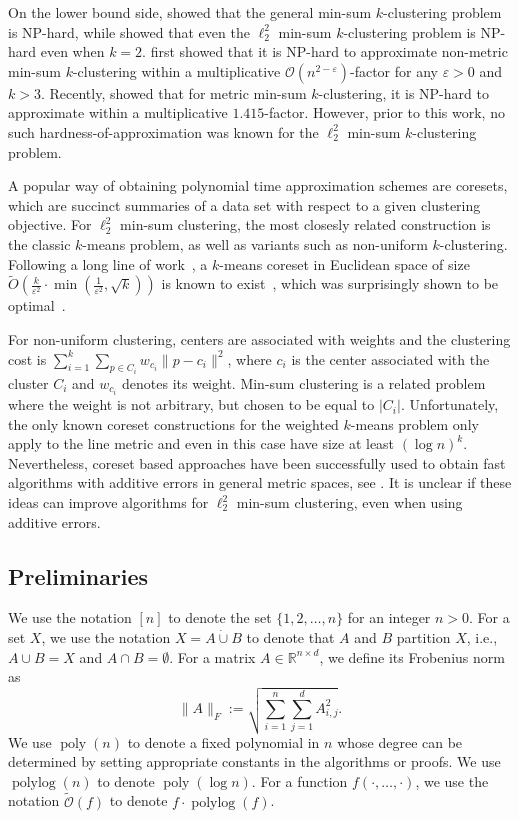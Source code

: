 \documentclass[10pt,a4paper]{amsart}
\renewcommand{\O}[1]{\ensuremath{\mathcal{O}\left(#1\right)}}
\newcommand{\tO}[1]{\ensuremath{\tilde{\mathcal{O}}\left(#1\right)}}
\newcommand{\eps}{\varepsilon}
\DeclareMathOperator*{\polylog}{polylog}
\DeclareMathOperator*{\poly}{poly}
\begin{document}
On the lower bound side,  \cite{Guttmann-BeckH98a} showed that the general min-sum $k$-clustering problem is NP-hard, while \cite{AloiseDHP09} showed that even the $\ell_2^2$ min-sum $k$-clustering problem is NP-hard even when $k=2$. 
\cite{KannKLP97} first showed that it is NP-hard to approximate non-metric min-sum $k$-clustering within a multiplicative $\O{n^{2-\eps}}$-factor for any $\eps>0$ and $k>3$. 
Recently, \cite{Cohen-AddadSL21} showed that for metric min-sum $k$-clustering, it is NP-hard to approximate within a multiplicative $1.415$-factor. 
However, prior to this work, no such hardness-of-approximation was known for the $\ell_2^2$ min-sum $k$-clustering problem. 

A popular way of obtaining polynomial time approximation schemes are coresets, which are succinct summaries of a data set with respect to a given clustering objective.
For $\ell_2^2$ min-sum clustering, the most closesly related construction is the classic $k$-means problem, as well as variants such as non-uniform $k$-clustering.
Following a long line of work~\cite{BecchettiBC0S19,FeldmanSS20,HuangV20,Cohen-AddadWZ23,WoodruffZZ23}, a $k$-means coreset in Euclidean space of size $\tilde{O}(\frac{k}{\eps^2}\cdot\min\left(\frac{1}{\eps^2},\sqrt{k}\right))$ is known to exist~\cite{Cohen-AddadSS21,Cohen-AddadLSSS22,BansalCPSS24}, which was surprisingly shown to be optimal~\cite{HuangLW24,ZhuTHH24}.

For non-uniform clustering, centers are associated with weights and the clustering cost is $\sum_{i=1}^k \sum_{p\in C_i} w_{c_i}\|p-c_i\|^2$, where $c_i$ is the center associated with the cluster $C_i$ and $w_{c_i}$ denotes its weight. Min-sum clustering is a related problem where the weight is not arbitrary, but chosen to be equal to $|C_i|$. Unfortunately, the only known coreset constructions for the weighted $k$-means problem \cite{FeldmanS12} only apply to the line metric and even in this case have size at least $(\log n)^k$.
Nevertheless, coreset based approaches have been successfully used to obtain fast algorithms with additive errors in general metric spaces, see \cite{CzumajS07}. It is unclear if these ideas can improve algorithms for $\ell_2^2$ min-sum clustering, even when using additive errors.

\subsection{Preliminaries}
We use the notation $[n]$ to denote the set $\{1,2,\ldots,n\}$ for an integer $n>0$. 
For a set $X$, we use the notation $X=A\dot\cup B$ to denote that $A$ and $B$ partition $X$, i.e., $A\cup B=X$ and $A\cap B=\emptyset$. 
For a matrix $A\in\mathbb{R}^{n\times d}$, we define its Frobenius norm as
\[\|A\|_F:=\sqrt{\sum_{i=1}^n\sum_{j=1}^d A_{i,j}^2}.\]
We use $\poly(n)$ to denote a fixed polynomial in $n$ whose degree can be determined by setting appropriate constants in the algorithms or proofs. 
We use $\polylog(n)$ to denote $\poly(\log n)$. 
For a function $f(\cdot,\ldots,\cdot)$, we use the notation $\tO{f}$ to denote $f\cdot\polylog(f)$. 
\end{document}
